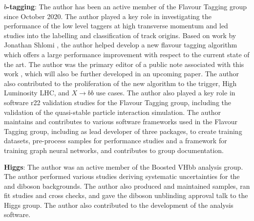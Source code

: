 \textbf{$b$-tagging}:
The author has been an active member of the Flavour Tagging group since October 2020. 
The author played a key role in investigating the performance of the low level taggers at high transverse momentum and led studies into the labelling and classification of track origins.
Based on work by Jonathan Shlomi \cite{2020-gnn-for-sv}, the author helped develop a new flavour tagging algorithm which offers a large performance improvement with respect to the current state of the art.
The author was the primary editor of a public note associated with this work \cite{ATL-PHYS-PUB-2022-027}, which will also be further developed in an upcoming paper.
The author also contributed to the proliferation of the new algorithm to the trigger, High Luminosity LHC, and $X \rightarrow bb$ use cases.
The author also played a key role in software r22 validation studies for the Flavour Tagging group, including the validation of the quasi-stable particle interaction simulation.
The author maintains and contributes to various software frameworks used in the Flavour Tagging group, including as lead developer of three packages, to create training datasets, pre-process samples for performance studies and a framework for training graph neural networks, and contributes to group documentation.

\textbf{Higgs}:
The author was an active member of the Boosted VHbb analysis group.
The author performed various studies deriving systematic uncertainties for the \Vjets and diboson backgrounds.
The author also produced and maintained samples, ran fit studies and cross checks, and gave the diboson unblinding approval talk to the Higgs group.
The author also contributed to the development of the analysis software.
